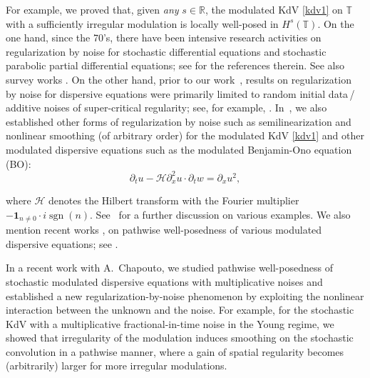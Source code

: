 \documentclass[letterpaper, 11pt,  reqno]{amsart}
\DeclareMathOperator{\sgn}{sgn}
\newcommand{\1}{\hspace{0.5mm}\text{I}\hspace{0.5mm}}
\newcommand{\noi}{\noindent}
\newcommand{\T}{\mathbb{T}}
\renewcommand{\H}{\mathcal{H}}
\newcommand{\dx}{\partial_x}
\newcommand{\dt}{\partial_t}
\newcommand{\ind}{\mathbf 1}
\numberwithin{equation}{section}
\numberwithin{theorem}{section}
\begin{document}
\noi
For example, 
we proved that, given {\it any} $s \in \mathbb R$, the modulated KdV \eqref{kdv1} on $\T$ with a sufficiently irregular modulation is locally well-posed in $H^s(\T)$. 
On the one hand, since the 70's, 
there have been intensive research activities
on regularization by noise 
for stochastic differential equations
and stochastic parabolic partial differential equations;
see
 \cite{
GP, 
KR, 
 FGP, GG0, G22, RT, CGLLO1,
 ABLL} for the  references therein.
See also   survey works \cite{Flan, Gess}.
On the other hand, 
prior to our work~\cite{CGLLO1}, 
results on regularization by noise 
for  dispersive equations
were primarily limited to random initial data\,/\,additive noises of super-critical regularity;
see, for example, 
\cite{BO96, BT08, CO, BT3, BOP2, Poc, OP, 
GKO2, DNY2, DNY3, OOT1, Bring, OOT2, BDNY}.
In~\cite{CGLLO1}, 
we also established 
other forms of regularization by noise
such as 
semilinearization and nonlinear smoothing
(of arbitrary order)
for the modulated KdV \eqref{kdv1}
and other modulated dispersive equations
such as the modulated Benjamin-Ono equation (BO):
\begin{equation}
\label{BO}
\dt u-    \H\dx^2 u \cdot \dt w=\dx u^2,
\end{equation}

\noi
where $\H$ denotes the
Hilbert transform
with the Fourier multiplier $- \ind_{n\ne 0}\cdot i \sgn (n)$.
See~\cite{CGLLO1}
for a further discussion on various examples.
We also mention 
recent works
\cite{Tanaka, Robert1, Robert2, Robert3, Robert4}, 
on pathwise well-posedness of  various modulated dispersive equations;
see \cite[Remark~1.14]{CGLLO1}.

In a recent work \cite{CGLLO2} with A.~Chapouto, we studied
pathwise well-posedness of stochastic modulated dispersive equations
with multiplicative noises
and established a new 
regularization-by-noise phenomenon by exploiting the nonlinear interaction between the unknown and the noise.
For example, 
for 
the stochastic KdV with 
a multiplicative fractional-in-time noise in the Young regime, 
%
%
we showed that 
irregularity of the modulation induces
smoothing on the stochastic convolution
in a pathwise manner, 
where 
a gain of spatial regularity  becomes (arbitrarily) larger for more irregular modulations.
\end{document}
